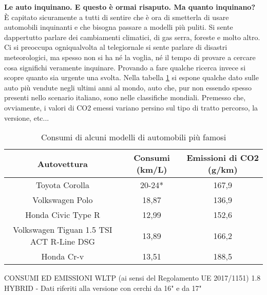 \textbf{\large Le auto inquinano. E questo è ormai risaputo. Ma quanto inquinano?}\\

È capitato sicuramente a tutti di sentire che è ora di smetterla di usare automobili inquinanti e che bisogna passare a modelli più puliti. Si sente dappertutto parlare dei cambiamenti climatici, di gas serra, foreste e molto altro. Ci si preoccupa ogniqualvolta al telegiornale si sente parlare di disastri meteorologici, ma spesso non si ha né la voglia, né il tempo di provare a cercare cosa significhi veramente inquinare. Provando a fare qualche ricerca invece si scopre quanto sia urgente una svolta. Nella tabella \ref{tabella auto} si espone qualche dato sulle auto più vendute negli ultimi anni al mondo, auto che, pur non essendo spesso presenti nello scenario italiano, sono nelle classifiche mondiali. Premesso che, ovviamente, i valori di CO2 emessi variano persino sul tipo di tratto percorso, la versione, etc...
\begin{table}[h!]
    \centering
    \begin{tabular}{|c|c|c|}
    \hline
        \textbf{\Large Autovettura} & \textbf{\Large Consumi (km/L)} & \textbf{\Large Emissioni di CO2 (g/km)} \\
        \hline
        Toyota Corolla & 20-24* & 167,9 \\
        \hline
        Volkswagen Polo & 18,87 & 136,9 \\
        \hline
        Honda Civic Type R & 12,99 & 152,6 \\
        \hline
        Volkswagen Tiguan 1.5 TSI ACT R-Line DSG & 13,89 & 166,2 \\
        \hline
        Honda Cr-v & 13,51 & 188,5 \\
        \hline
    \end{tabular}
    \caption{Consumi di alcuni modelli di automobili più famosi}
    \label{tabella auto}
\end{table}
\small *CONSUMI ED EMISSIONI WLTP (ai sensi del Regolamento UE 2017/1151) 1.8 HYBRID - Dati riferiti alla versione con cerchi da 16" e da 17"

